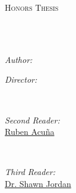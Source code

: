 \documentclass[
11pt, %
english, %
singlespacing, %
headsepline, %
]{MastersDoctoralThesis} %
\author{Dylan \textsc{Lathrum}} %
\begin{document}
\frontmatter %

\pagestyle{plain} %


\begin{titlepage}
	\begin{center}

		\vspace*{.06\textheight}
		{\scshape\LARGE \univname\par}\vspace{1.5cm} %
		\textsc{\Large Honors Thesis}\\[0.5cm] %

		\HRule \\[0.4cm] %
		{\huge \bfseries \ttitle\par}\vspace{0.4cm} %
		\HRule \\[1.5cm] %

		\begin{minipage}[t]{0.4\textwidth}
			\begin{flushleft} \large
				\emph{Author:}\\
				\href{https://www.linkedin.com/in/dylanlathrum/}{\authorname} %
			\end{flushleft}
		\end{minipage}
		\begin{minipage}[t]{0.4\textwidth}
			\begin{flushright} \large
				\emph{Director:} \\
				\href{https://isearch.asu.edu/profile/3180015}{\supname} %
			\end{flushright}
		\end{minipage}\\[.5cm]

		\begin{minipage}[t]{0.8\textwidth}
			\begin{flushright} \large
				\emph{Second Reader:}\\
				\href{https://isearch.asu.edu/profile/1232839/}{Ruben Acu\~{n}a}
			\end{flushright}
		\end{minipage}\\[.5cm]
		\begin{minipage}[t]{0.8\textwidth}
			\begin{flushright} \large
				\emph{Third Reader:} \\
				\href{https://isearch.asu.edu/profile/1625795}{Dr. Shawn Jordan}
			\end{flushright}
		\end{minipage}\\[3cm]


\end{center}
\end{titlepage}
\end{document}
